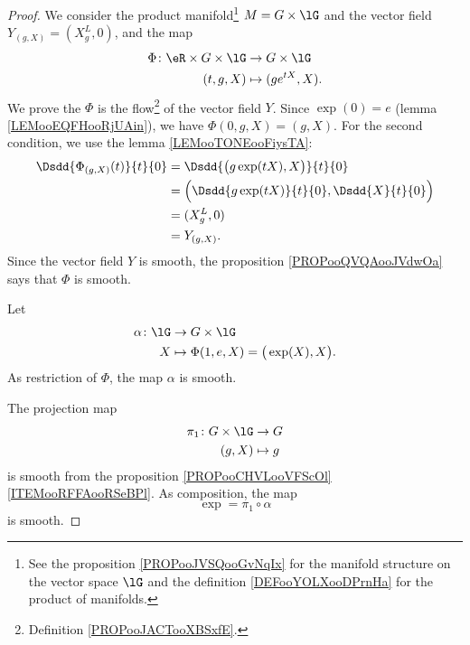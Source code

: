 \begin{proof}
	We consider the product manifold\footnote{See the proposition \ref{PROPooJVSQooGvNqIx} for the manifold structure on the vector space \( \lG\) and the definition \ref{DEFooYOLXooDPrnHa} for the product of manifolds.} \( M=G\times \lG\) and the vector field \( Y_{(g,X)}=(X^L_g,0)\), and the map
	\begin{equation}
		\begin{aligned}
			\Phi\colon \eR\times G\times \lG & \to G\times \lG         \\
			(t,g,X)                          & \mapsto (g e^{tX}, X) .
		\end{aligned}
	\end{equation}
	We prove the \( \Phi\) is the flow\footnote{Definition \ref{PROPooJACTooXBSxfE}.} of the vector field \( Y\). Since \( \exp(0)=e\) (lemma \ref{LEMooEQFHooRjUAin}), we have \( \Phi(0,g,X)=(g,X)\). For the second condition, we use the lemma \ref{LEMooTONEooFiysTA}:
	\begin{subequations}
		\begin{align}
			\Dsdd{ \Phi_{(g,X)}(t) }{t}{0} & =\Dsdd{ \big( g\exp(tX),X \big) }{t}{0}                \\
			                               & =\Big( \Dsdd{ g\exp(tX) }{t}{0},\Dsdd{ X }{t}{0} \Big) \\
			                               & =(X^L_g,0)                                             \\
			                               & =Y_{(g,X)}.
		\end{align}
	\end{subequations}
	Since the vector field \( Y\) is smooth, the proposition \ref{PROPooQVQAooJVdwOa} says that \( \Phi\) is smooth.

	Let
	\begin{equation}
		\begin{aligned}
			\alpha\colon \lG & \to G\times \lG                            \\
			X                & \mapsto \Phi(1,e,X)=\big( \exp(X),X \big).
		\end{aligned}
	\end{equation}
	As restriction of \( \Phi\), the map \( \alpha\) is smooth.

	The projection map
	\begin{equation}
		\begin{aligned}
			\pi_1\colon G\times \lG & \to G     \\
			(g,X)                   & \mapsto g
		\end{aligned}
	\end{equation}
	is smooth from the proposition \ref{PROPooCHVLooVFScOl}\ref{ITEMooRFFAooRSeBPl}. As composition, the map
	\begin{equation}
		\exp=\pi_1\circ\alpha
	\end{equation}
	is smooth.
\end{proof}

